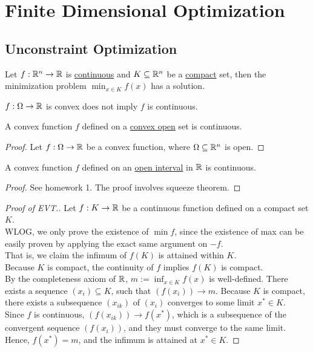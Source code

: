 \documentclass{article}
\begin{document}
	\section{Finite Dimensional Optimization}
	\subsection{Unconstraint Optimization}
    \begin{theorem}
        Let $f: \mathbb{R}^n \to \mathbb{R}$ is \ul{continuous} and $K \subseteq \mathbb{R}^n$ be a \ul{compact} set, then the minimization problem $\min_{x \in K} f(x)$ has a solution.
    \end{theorem}
    
    \begin{remark}
    	$f: \Omega \to \mathbb{R}$ is convex does not imply $f$ is continuous.
    \end{remark}
    
    \begin{proposition}
    	A convex function $f$ defined on a \ul{convex open} set is continuous.
    \end{proposition}
    
    \begin{proof}
    	Let $f: \Omega \to \mathbb{R}$ be a convex function, where $\Omega \subseteq \mathbb{R}^n$ is open.
    \end{proof}
    
    \begin{proposition}
    	A convex function $f$ defined on an \ul{open interval} in $\mathbb{R}$ is continuous.
    \end{proposition}
    
    \begin{proof}
    	See homework 1. The proof involves squeeze theorem.
    \end{proof}
    
    \begin{proof}[Proof of EVT.]
    	Let $f: K \to \mathbb{R}$ be a continuous function defined on a compact set $K$.\\
    	WLOG, we only prove the existence of $\min f$, since the existence of max can be easily proven by applying the exact same argument on $-f$. \\
    	That is, we claim the infimum of $f(K)$ is attained within $K$. \\
    	Because $K$ is compact, the continuity of $f$ implies $f(K)$ is compact. \\
    	By the completeness axiom of $\mathbb{R}$, $m := \inf_{x \in K} f(x)$ is well-defined. There exists a sequence $(x_i) \subseteq K$, such that $(f(x_i)) \to m$. Because $K$ is compact, there exists a subsequence $(x_{ik})$ of $(x_i)$ converges to some limit $x^* \in K$. \\
    	Since $f$ is continuous, $(f(x_{ik})) \to f(x^*)$, which is a subsequence of the convergent sequence $(f(x_i))$, and they must converge to the same limit. Hence, $f(x^*) = m$, and the infimum is attained at $x^* \in K$.
    \end{proof}
    
\end{document}
